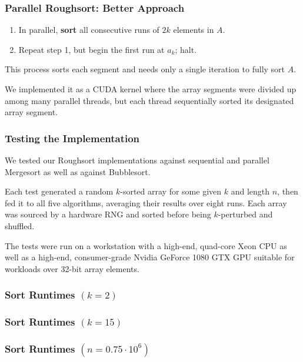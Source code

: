 \documentclass[10pt, xcolor={dvipsnames}, aspectratio=169]{beamer}
\begin{document}
\begin{frame}
\frametitle{Parallel Roughsort: Better Approach}
\begin{enumerate}\setlength{\itemsep}{0pt}\setlength{\parskip}{0pt}
\item In parallel, \textbf{sort} all consecutive runs of $2k$ elements in $A$.
\item Repeat step 1, but begin the first run at $a_k$; halt.
\end{enumerate}
This process sorts each segment and needs only a single iteration to fully sort $A$. \newline

We implemented it as a CUDA kernel where the array segments were divided up among many parallel threads,
  but each thread sequentially sorted its designated array segment.
\end{frame}

\begin{frame}
\frametitle{Testing the Implementation}
We tested our Roughsort implementations against sequential and parallel Mergesort as well as against Bubblesort. \newline

Each test generated a random $k$-sorted array for some given $k$ and length $n$, then fed it to all five algorithms, averaging
  their results over eight runs. Each array was sourced by a hardware RNG and sorted before being
  $k$-perturbed and shuffled. \newline

The tests were run on a workstation with a high-end, quad-core Xeon CPU as well as a high-end, consumer-grade
  Nvidia GeForce 1080 GTX GPU suitable for workloads over 32-bit array elements.
\end{frame}

\begin{frame}
\frametitle{Sort Runtimes $(k = 2)$}
\begin{figure}
\scalebox{0.4}{}
\end{figure}
\end{frame}

\begin{frame}
\frametitle{Sort Runtimes $(k = 15)$}
\begin{figure}
\scalebox{0.4}{}
\end{figure}
\end{frame}

\begin{frame}
\frametitle{Sort Runtimes $(n = 0.75 \cdot 10^6)$}
\begin{figure}
\scalebox{0.4}{}
\end{figure}
\end{frame}
\end{document}
